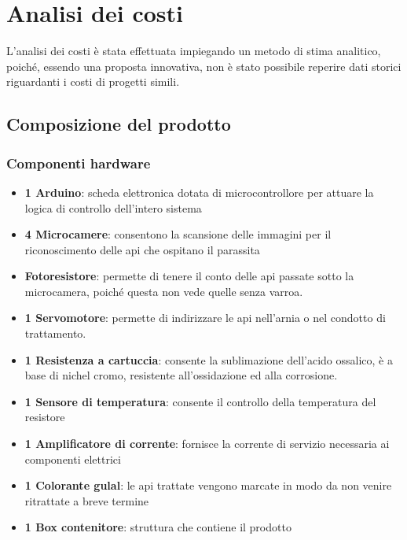 \section{Analisi dei costi}
L'analisi dei costi è stata effettuata impiegando un metodo di stima analitico,
poiché, essendo una proposta innovativa, non è stato possibile reperire dati
storici riguardanti i costi di progetti simili.
\subsection{Composizione del prodotto}
\subsubsection{Componenti hardware}
\begin{itemize}
\item \textbf{1 Arduino}: scheda elettronica dotata di microcontrollore per
attuare la logica di controllo dell’intero sistema
\item \textbf{4 Microcamere}: consentono la scansione delle immagini per il
riconoscimento delle api che ospitano il parassita
\item \textbf{Fotoresistore}: permette di tenere il conto delle api passate
sotto la microcamera, poiché questa non vede quelle senza varroa.
\item \textbf{1 Servomotore}: permette di indirizzare le api nell’arnia o nel
condotto di trattamento.
\item \textbf{1 Resistenza a cartuccia}: consente la sublimazione dell’acido
ossalico, è a base di nichel cromo, resistente all’ossidazione ed alla
corrosione.
\item \textbf{1 Sensore di temperatura}: consente il controllo della temperatura
del resistore
\item \textbf{1 Amplificatore di corrente}: fornisce la corrente di servizio
necessaria ai componenti elettrici
\item \textbf{1 Colorante gulal}: le api trattate vengono marcate in modo da non
venire ritrattate a breve termine
\item \textbf{1 Box contenitore}: struttura che contiene il prodotto
\end{itemize}
